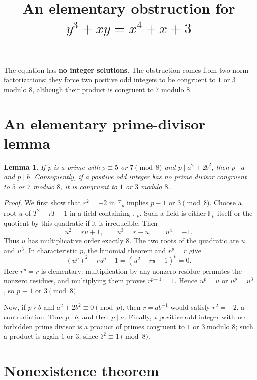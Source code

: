 \documentclass[11pt,a4paper]{article}
\title{\vspace{-1.1cm}An elementary obstruction for\\[3pt]
\(y^3+xy=x^4+x+3\)}
\author{}
\date{\vspace{-1.1cm}}
\newtheorem{lemma}{Lemma}
\newcommand{\Fp}{\mathbb F_p}
\begin{document}
\maketitle
\vspace{-0.4cm}

The equation has \textbf{no integer solutions}. The obstruction comes from two
norm factorizations: they force two positive odd integers to be congruent to
$1$ or $3$ modulo $8$, although their product is congruent to $7$ modulo $8$.

\section{An elementary prime-divisor lemma}

\begin{lemma}\label{lem:prime}
If $p$ is a prime with $p\equiv5$ or $7\pmod8$ and
$p\mid a^2+2b^2$, then $p\mid a$ and $p\mid b$.
Consequently, if a positive odd integer has no prime divisor congruent to
$5$ or $7$ modulo $8$, it is congruent to $1$ or $3$ modulo $8$.
\end{lemma}

\begin{proof}
We first show that $r^2=-2$ in $\Fp$ implies $p\equiv1$ or $3\pmod8$.
Choose a root $u$ of $T^2-rT-1$ in a field containing $\Fp$.
Such a field is either $\Fp$ itself or the quotient by this quadratic if it
is irreducible. Then
\[
 u^2=ru+1,\qquad u^3=r-u,\qquad u^4=-1.
\]
Thus $u$ has multiplicative order exactly $8$. The two roots of the
quadratic are $u$ and $u^3$. In characteristic $p$, the binomial theorem
and $r^p=r$ give
\[
 (u^p)^2-r u^p-1=(u^2-ru-1)^p=0.
\]
Here $r^p=r$ is elementary: multiplication by any nonzero residue
permutes the nonzero residues, and multiplying them proves
$r^{p-1}=1$. Hence $u^p=u$ or $u^p=u^3$, so $p\equiv1$ or $3\pmod8$.

Now, if $p\nmid b$ and $a^2+2b^2\equiv0\pmod p$, then
$r=ab^{-1}$ would satisfy $r^2=-2$, a contradiction. Thus $p\mid b$,
and then $p\mid a$. Finally, a positive odd integer with no forbidden
prime divisor is a product of primes congruent to $1$ or $3$ modulo $8$;
such a product is again $1$ or $3$, since $3^2\equiv1\pmod8$.
\end{proof}

\section{Nonexistence theorem}
\end{document}
